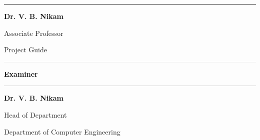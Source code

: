 \begin{center}
	\noindent
	\begin{minipage}[t]{0.30\textwidth}
		\centering
		
		\rule{5cm}{0.5pt}
		
		\vspace{0.25cm}
		
		\textbf{Dr. V. B. Nikam}
		
		Associate Professor
		
		Project Guide
		
	\end{minipage}
	\hfill
	\begin{minipage}[t]{0.30\textwidth}
		\centering
		
		\rule{5cm}{0.5pt}
		
		\vspace{0.25cm}
		
		\textbf{Examiner}
		
	\end{minipage}
	\hfill
	\begin{minipage}[t]{0.30\textwidth}
		\centering
		
		\rule{5cm}{0.5pt}
		
		\vspace{0.25cm}
		
		\textbf{Dr. V. B. Nikam}
		
		Head of Department
		
		Department of Computer Engineering
		
	\end{minipage}
\end{center}

\clearpage